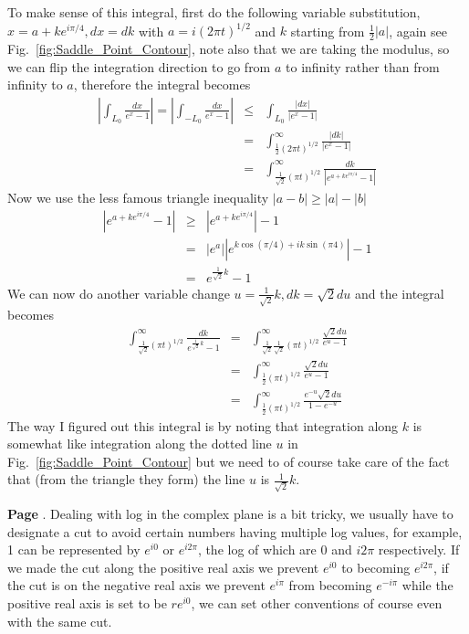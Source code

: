 \documentclass[aps,preprint,preprintnumbers,nofootinbib,showpacs,prd]{revtex4-1}
\newcommand{\nbea}{\begin{eqnarray*}}
\newcommand{\neea}{\end{eqnarray*}}
\begin{document}
To make sense of this integral, first do the following variable substitution, $x = a + k e^{i\pi/4}, dx = dk$ with $a = i(2\pi t)^{1/2}$ and $k$ starting from $\frac{1}{2} |a|$, again see Fig.~\ref{fig:Saddle_Point_Contour}, note also that we are taking the modulus, so we can flip the integration direction to go from $a$ to infinity rather than from infinity to $a$, therefore the integral becomes
%
\nbea
\left | \int_{L_0} \frac{dx}{e^x - 1} \right | = \left | \int_{-L_0} \frac{dx}{e^x - 1} \right | & \le & \int_{L_0} \frac{|dx|}{|e^x - 1|} \\
& = & \int_{\frac{1}{2}(2\pi t)^{1/2}}^\infty \frac{|dk|}{|e^x - 1|} \\
& = & \int_{\frac{1}{\sqrt{2}}(\pi t)^{1/2}}^\infty \frac{dk}{|e^{a + k e^{i\pi/4}} - 1|}
\neea
%
Now we use the less famous triangle inequality $|a- b| \ge |a| - |b|$
%
\nbea
|e^{a + k e^{i\pi/4}} - 1| & \ge & |e^{a + k e^{i\pi/4}}| - 1 \\
& = & |e^{a}||e^{k \cos (\pi/4) + i k \sin(\pi 4)}| - 1 \\
& = & e^{\frac{1}{\sqrt{2}}k } - 1
\neea
%
We can now do another variable change $u = \frac{1}{\sqrt{2}} k, dk = \sqrt{2} du$ and the integral becomes
%
\nbea
\int_{\frac{1}{\sqrt{2}}(\pi t)^{1/2}}^\infty \frac{dk}{e^{\frac{1}{\sqrt{2}}k } - 1} & = & \int_{\frac{1}{\sqrt{2}}\frac{1}{\sqrt{2}}(\pi t)^{1/2}}^\infty \frac{\sqrt{2} du}{e^{u} - 1} \\
& = & \int_{\frac{1}{2}(\pi t)^{1/2}}^\infty \frac{\sqrt{2} du}{e^{u} - 1} \\
& = & \int_{\frac{1}{2}(\pi t)^{1/2}}^\infty \frac{e^{-u}\sqrt{2} du}{1 - e^{-u}}
\neea
%
The way I figured out this integral is by noting that integration along $k$ is somewhat like integration along the dotted line $u$ in Fig.~\ref{fig:Saddle_Point_Contour} but we need to of course take care of the fact that (from the triangle they form) the line $u$ is $\frac{1}{\sqrt{2}} k$.










{\bf Page }. Dealing with log in the complex plane is a bit tricky, we usually have to designate a cut to avoid certain numbers having multiple log values, for example, 1 can be represented by $e^{i0}$ or $e^{i2\pi}$, the log of which are $0$ and $i 2\pi$ respectively. If we made the cut along the positive real axis we prevent $e^{i0}$ to becoming $e^{i2\pi}$, if the cut is on the negative real axis we prevent $e^{i\pi}$ from becoming $e^{-i\pi}$ while the positive real axis is set to be $r e^{i0}$, we can set other conventions of course even with the same cut.
\end{document}
